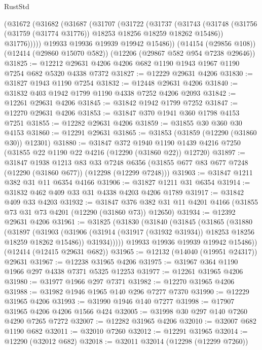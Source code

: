 \begin{lexlean}{RustStd}
\begin{coremodule}
    (@31672
      (@31682
        (@31687
          (@31707
            (@31722
              (@31737
                (@31743
                  (@31748 (@31756 (@31759 (@31774 @31776)) @18253 @18256 @18259 @18262 @15486))
                  @31776)))))
        @19933
        @19936
        @19939
        @19942
        @15486))
    (@14154 (@29856 @108))
    (@12414 (@29860 @15070 @582))
    (@12206 (@29867 @582 @954 @7238 @29646))
@31825 := @12212 @29631 @4206 @4206 @682 @1190 @1943 @1967 @1190 @7254 @682 @5320 @4338 @7372
@31827 := @12229 @29631 @4206
@31830 := @31827 @1943 @1190 @7254
@31832 := @12448 @29631 @4206
@31840 := @31832 @403 @1942 @1799 @1190 @4338 @7252 @4206 @2093
@31842 := @12261 @29631 @4206
@31845 := @31842 @1942 @1799 @7252
@31847 := @12270 @29631 @4206
@31853 := @31847 @370 @1941 @360 @1798 @4153 @7251
@31855 := @12282 @29631 @4206
@31859 := @31855 @30 @360 @30 @4153
@31860 := @12291 @29631
@31865 := @31853 (@31859 (@12290 (@31860 @30)) @12301)
@31880 := @31847
    @372
    @1940
    @1190
    @1439
    @4216
    @7250
    (@31855 @22 @1190 @22 @4216 (@12290 (@31860 @22)) @12720)
@31897 := @31847
    @1938
    @1213
    @83
    @33
    @7248
    @6356
    (@31855 @677 @83 @677 @7248 (@12290 (@31860 @677)) (@12298 (@12299 @7248)))
@31903 := @31847 @1211 @382 @31 @11 @6354 @4166
@31906 := @31827 @1211 @31 @6354
@31914 := @31832 @462 @409 @33 @31 @4338 @4203 @4206 @1789
@31917 := @31842 @409 @33 @4203
@31932 := @31847
    @376
    @382
    @31
    @11
    @4201
    @4166
    (@31855 @73 @31 @73 @4201 (@12290 (@31860 @73)) @12650)
@31934 := @12392 @29631 @4206
@31961 := @31825
    (@31830
      (@31840
        (@31845
          (@31865
            (@31880
              (@31897
                (@31903
                  (@31906 (@31914 (@31917 (@31932 @31934)) @18253 @18256 @18259 @18262 @15486))
                  @31934)))))
        @19933
        @19936
        @19939
        @19942
        @15486))
    (@12414 (@12415 @29631 @682))
@31965 := @12132 (@14040 (@19951 @24317)) @29631
@31967 := @12238 @31965 @4206
@31975 := @31967 @364 @1190 @1966 @297 @4338 @7371 @5325 @12253
@31977 := @12261 @31965 @4206
@31980 := @31977 @1966 @297 @7371
@31982 := @12270 @31965 @4206
@31988 := @31982 @1946 @1965 @140 @296 @7277 @7370
@31990 := @12229 @31965 @4206
@31993 := @31990 @1946 @140 @7277
@31998 := @17907 @31965 @4206 @4206 @1566 @424
@32005 := @31998 @30 @297 @140 @7260 @4290 @7265 @7272
@32007 := @12282 @31965 @4206
@32010 := @32007 @682 @1190 @682
@32011 := @32010 @7260
@32012 := @12291 @31965
@32014 := @12290 (@32012 @682)
@32018 := @32011 @32014 (@12298 (@12299 @7260))

\end{coremodule}
\end{lexlean}
